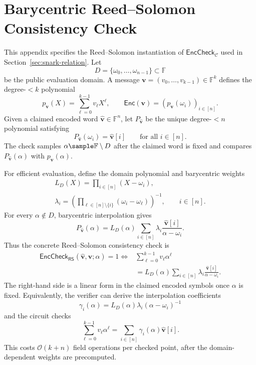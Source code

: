 \documentclass[conference,compsoc]{IEEEtran}
\newcommand{\vect}{\mathbf}         %
\renewcommand{\enc}{\mathsf{Enc}}   %
\theoremstyle{plain}
\theoremstyle{definition}
\theoremstyle{remark}
\begin{document}
\section{Barycentric Reed--Solomon Consistency Check}
\label{app:rs-barycentric}

This appendix specifies the Reed--Solomon instantiation of
\(\mathsf{EncCheck}_{\mathcal{C}}\) used in
Section~\ref{sec:snark-relation}.  Let
\[
D=\{\omega_0,\ldots,\omega_{n-1}\}\subset\mathbb{F}
\]
be the public evaluation domain.  A message
\(\vect{v}=(v_0,\ldots,v_{k-1})\in\mathbb{F}^k\) defines the degree-\(<k\)
polynomial
\[
  p_{\vect{v}}(X)=\sum_{\ell=0}^{k-1} v_\ell X^\ell,
  \qquad
  \enc(\vect{v})=(p_{\vect{v}}(\omega_i))_{i\in[n]}.
\]
Given a claimed encoded word
\(\widehat{\vect{v}}\in\mathbb{F}^n\), let
\(P_{\widehat{\vect{v}}}\) be the unique degree-\(<n\) polynomial satisfying
\[
  P_{\widehat{\vect{v}}}(\omega_i)=\widehat{\vect{v}}[i]
  \qquad\text{for all }i\in[n].
\]
The check samples \(\alpha\sample\mathbb{F}\setminus D\) after the claimed
word is fixed and compares \(P_{\widehat{\vect{v}}}(\alpha)\) with
\(p_{\vect{v}}(\alpha)\).

For efficient evaluation, define the domain polynomial and barycentric weights
\[
\begin{gathered}
  L_D(X)=\prod_{i\in[n]}(X-\omega_i),
  \\
  \lambda_i
  =
  \left(\prod_{\ell\in[n]\setminus\{i\}}(\omega_i-\omega_\ell)\right)^{-1},
  \qquad i\in[n].
\end{gathered}
\]
For every \(\alpha\notin D\), barycentric interpolation gives
\[
  P_{\widehat{\vect{v}}}(\alpha)
  =
  L_D(\alpha)
  \sum_{i\in[n]}
  \lambda_i
  \frac{\widehat{\vect{v}}[i]}{\alpha-\omega_i}.
\]
Thus the concrete Reed--Solomon consistency check is
\[
\begin{aligned}
\mathsf{EncCheck}_{\mathsf{RS}}
(\widehat{\vect{v}},\vect{v};\alpha)=1
\Longleftrightarrow{}&
\sum_{\ell=0}^{k-1} v_\ell \alpha^\ell
\\
&=
L_D(\alpha)
  \sum_{i\in[n]}
\lambda_i
\frac{\widehat{\vect{v}}[i]}{\alpha-\omega_i}.
\end{aligned}
\]
The right-hand side is a linear form in the claimed encoded symbols once
\(\alpha\) is fixed.  Equivalently, the verifier can derive the interpolation
coefficients
\[
  \gamma_i(\alpha)
  =
  L_D(\alpha)\lambda_i(\alpha-\omega_i)^{-1}
\]
and the circuit checks
\[
  \sum_{\ell=0}^{k-1} v_\ell \alpha^\ell
  =
  \sum_{i\in[n]}\gamma_i(\alpha)\widehat{\vect{v}}[i].
\]
This costs \(\mathcal{O}(k+n)\) field operations per checked point, after the
domain-dependent weights are precomputed.
\end{document}
